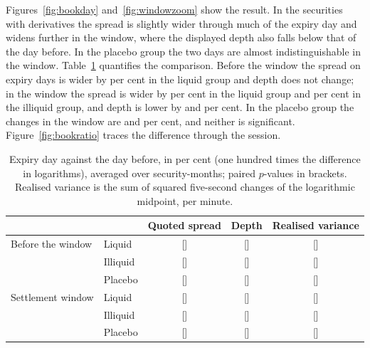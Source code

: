 Figures~\ref{fig:bookday} and~\ref{fig:windowzoom} show the result. In the securities with
derivatives the spread is slightly wider through much of the expiry day and widens further in
the window, where the displayed depth also falls below that of the day before. In the placebo
group the two days are almost indistinguishable in the window. Table~\ref{tab:bookparts}
quantifies the comparison. Before the window the spread on expiry days is wider by
\BookdayDayLiquidSpread{} per cent in the liquid group and depth does not change; in the window
the spread is wider by \BookdayWindowLiquidSpread{} per cent in the liquid group and
\BookdayWindowIlliquidSpread{} per cent in the illiquid group, and depth is lower by
\BookdayWindowLiquidDepth{} and \BookdayWindowIlliquidDepth{} per cent. In the placebo group the
changes in the window are \BookdayWindowPlaceboSpread{} and \BookdayWindowPlaceboDepth{} per
cent, and neither is significant. Figure~\ref{fig:bookratio} traces the difference through the
session.

\begin{table}[htbp]
\centering
\small
\caption{Expiry day against the day before, in per cent (one hundred times the difference in
logarithms), averaged over security-months; paired $p$-values in brackets. Realised variance
is the sum of squared five-second changes of the logarithmic midpoint, per minute.}
\label{tab:bookparts}
\begin{tabular}{llccc}
\toprule
 & & Quoted spread & Depth & Realised variance \\
\midrule
Before the window & Liquid & \BookdayDayLiquidSpread{} [\BookdayDayLiquidSpreadP{}] & \BookdayDayLiquidDepth{} [\BookdayDayLiquidDepthP{}] & \BookdayDayLiquidRv{} [\BookdayDayLiquidRvP{}] \\
 & Illiquid & \BookdayDayIlliquidSpread{} [\BookdayDayIlliquidSpreadP{}] & \BookdayDayIlliquidDepth{} [\BookdayDayIlliquidDepthP{}] & \BookdayDayIlliquidRv{} [\BookdayDayIlliquidRvP{}] \\
 & Placebo & \BookdayDayPlaceboSpread{} [\BookdayDayPlaceboSpreadP{}] & \BookdayDayPlaceboDepth{} [\BookdayDayPlaceboDepthP{}] & \BookdayDayPlaceboRv{} [\BookdayDayPlaceboRvP{}] \\
\midrule
Settlement window & Liquid & \BookdayWindowLiquidSpread{} [\BookdayWindowLiquidSpreadP{}] & \BookdayWindowLiquidDepth{} [\BookdayWindowLiquidDepthP{}] & \BookdayWindowLiquidRv{} [\BookdayWindowLiquidRvP{}] \\
 & Illiquid & \BookdayWindowIlliquidSpread{} [\BookdayWindowIlliquidSpreadP{}] & \BookdayWindowIlliquidDepth{} [\BookdayWindowIlliquidDepthP{}] & \BookdayWindowIlliquidRv{} [\BookdayWindowIlliquidRvP{}] \\
 & Placebo & \BookdayWindowPlaceboSpread{} [\BookdayWindowPlaceboSpreadP{}] & \BookdayWindowPlaceboDepth{} [\BookdayWindowPlaceboDepthP{}] & \BookdayWindowPlaceboRv{} [\BookdayWindowPlaceboRvP{}] \\
\bottomrule
\end{tabular}
\end{table}

